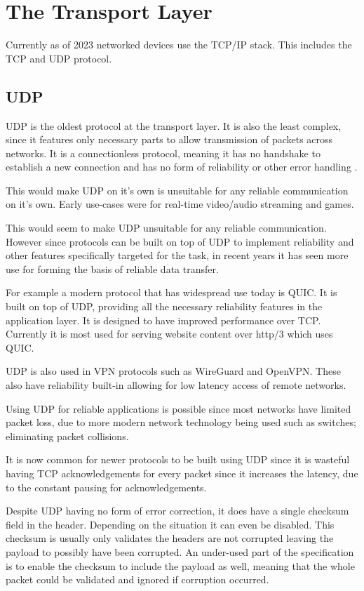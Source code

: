 \section{The Transport Layer}
Currently as of 2023 networked devices use the TCP/IP stack. This includes the TCP and UDP protocol.

\subsection*{UDP}
UDP is the oldest protocol at the transport layer. It is also the least complex, since it features only necessary parts to allow transmission of packets across networks. It is a connectionless protocol, meaning it has no handshake to establish a new connection and has no form of reliability or other error handling \parencite{udp-rfc768}.

This would make UDP on it's own is unsuitable for any reliable communication on it's own. Early use-cases were for real-time video/audio streaming and games.

This would seem to make UDP unsuitable for any reliable communication. However since protocols can be built on top of UDP to implement reliability and other features specifically targeted for the task, in recent years it has seen more use for forming the basis of reliable data transfer.

For example a modern protocol that has widespread use today is QUIC. It is built on top of UDP, providing all the necessary reliability features in the application layer. It is designed to have improved performance over TCP. Currently it is most used for serving website content over http/3 which uses QUIC.

UDP is also used in VPN protocols such as WireGuard and OpenVPN. These also have reliability built-in allowing for low latency access of remote networks.

Using UDP for reliable applications is possible since most networks have limited packet loss, due to more modern network technology being used such as switches; eliminating packet collisions.

It is now common for newer protocols to be built using UDP since it is wasteful having TCP acknowledgements for every packet since it increases the latency, due to the constant pausing for acknowledgements.

Despite UDP having no form of error correction, it does have a single checksum field in the header. Depending on the situation it can even be disabled. This checksum is usually only validates the headers are not corrupted leaving the payload to possibly have been corrupted. An under-used part of the specification is to enable the checksum to include the payload as well, meaning that the whole packet could be validated and ignored if corruption occurred.

